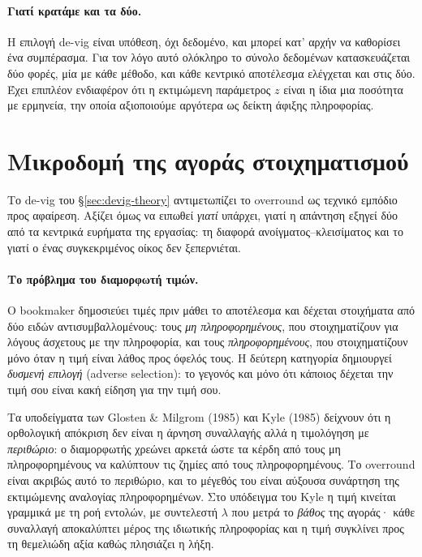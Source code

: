 \documentclass[12pt,a4paper,oneside]{report}
\newcommand{\en}[1]{\textenglish{#1}}
\renewcommand{\_}{\oldunderscore\allowbreak}
\theoremstyle{definition}
\theoremstyle{plain}
\theoremstyle{remark}
\begin{document}
\paragraph{Γιατί κρατάμε και τα δύο.} Η επιλογή de-vig είναι υπόθεση, όχι δεδομένο, και
μπορεί κατ' αρχήν να καθορίσει ένα συμπέρασμα. Για τον λόγο αυτό ολόκληρο το σύνολο
δεδομένων κατασκευάζεται δύο φορές, μία με κάθε μέθοδο, και κάθε κεντρικό αποτέλεσμα
ελέγχεται και στις δύο. Έχει επιπλέον ενδιαφέρον ότι η εκτιμώμενη παράμετρος $z$ είναι η ίδια
μια ποσότητα με ερμηνεία, την οποία αξιοποιούμε αργότερα ως δείκτη άφιξης πληροφορίας.

\section{Μικροδομή της αγοράς στοιχηματισμού}
\label{sec:microstructure-theory}

Το de-vig του \S\ref{sec:devig-theory} αντιμετωπίζει το overround ως τεχνικό εμπόδιο προς
αφαίρεση. Αξίζει όμως να ειπωθεί \emph{γιατί} υπάρχει, γιατί η απάντηση εξηγεί δύο από τα
κεντρικά ευρήματα της εργασίας: τη διαφορά ανοίγματος--κλεισίματος και το γιατί ο ένας
συγκεκριμένος οίκος δεν ξεπερνιέται.

\paragraph{Το πρόβλημα του διαμορφωτή τιμών.} Ο bookmaker δημοσιεύει τιμές πριν μάθει το
αποτέλεσμα και δέχεται στοιχήματα από δύο ειδών αντισυμβαλλομένους: τους
\emph{μη πληροφορημένους}, που στοιχηματίζουν για λόγους άσχετους με την πληροφορία, και τους
\emph{πληροφορημένους}, που στοιχηματίζουν μόνο όταν η τιμή είναι λάθος προς όφελός τους. Η
δεύτερη κατηγορία δημιουργεί \emph{δυσμενή επιλογή} (\en{adverse selection}): το γεγονός και
μόνο ότι κάποιος δέχεται την τιμή σου είναι κακή είδηση για την τιμή σου.

Τα υποδείγματα των Glosten \& Milgrom (1985) και Kyle (1985) δείχνουν ότι η ορθολογική
απόκριση δεν είναι η άρνηση συναλλαγής αλλά η τιμολόγηση με \emph{περιθώριο}: ο διαμορφωτής
χρεώνει αρκετά ώστε τα κέρδη από τους μη πληροφορημένους να καλύπτουν τις ζημίες από τους
πληροφορημένους. Το overround είναι ακριβώς αυτό το περιθώριο, και το μέγεθός του είναι
αύξουσα συνάρτηση της εκτιμώμενης αναλογίας πληροφορημένων. Στο υπόδειγμα του Kyle η τιμή
κινείται γραμμικά με τη ροή εντολών, με συντελεστή $\lambda$ που μετρά το \emph{βάθος} της
αγοράς· κάθε συναλλαγή αποκαλύπτει μέρος της ιδιωτικής πληροφορίας και η τιμή συγκλίνει προς
τη θεμελιώδη αξία καθώς πλησιάζει η λήξη.
\end{document}

